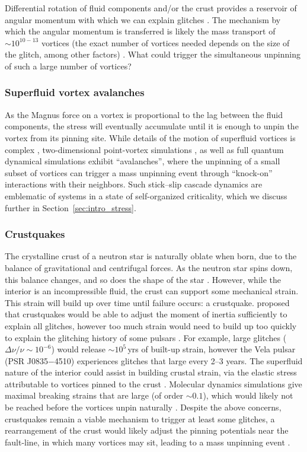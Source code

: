 Differential rotation of fluid components and/or the crust provides a reservoir of angular momentum with which we can explain glitches \citep{Baym1969}. The mechanism by which the angular momentum is transferred is likely the mass transport of $\sim 10^{10-13}$ vortices (the exact number of vortices needed depends on the size of the glitch, among other factors) \citep{Anderson1975,Alpar1984}. What could trigger the simultaneous unpinning of such a large number of vortices? 

\subsubsection{Superfluid vortex avalanches}
As the Magnus force on a vortex is proportional to the lag between the fluid components, the stress will eventually accumulate until it is enough to unpin the vortex from its pinning site. While details of the motion of superfluid vortices is complex \citep{Link2022}, two-dimensional point-vortex simulations \citep{Howitt2020}, as well as full quantum dynamical simulations \citep{Warszawski2011,Warszawski2013,Lonnborn2019} exhibit ``avalanches'', where the unpinning of a small subset of vortices can trigger a mass unpinning event through ``knock-on'' interactions with their neighbors. Such stick--slip cascade dynamics are emblematic of systems in a state of self-organized criticality, which we discuss further in Section~\ref{sec:intro_stress}.

\subsubsection{Crustquakes}
The crystalline crust of a neutron star is naturally oblate when born, due to the balance of gravitational and centrifugal forces. As the neutron star spins down, this balance changes, and so does the shape of the star \citep{Pines1972}. However, while the interior is an incompressible fluid, the crust can support some mechanical strain. This strain will build up over time until failure occurs: a crustquake. \citet{Ruderman1969} proposed that crustquakes would be able to adjust the moment of inertia sufficiently to explain all glitches, however too much strain would need to build up too quickly to explain the glitching history of some pulsars \citep{Baym1971}. For example, large glitches ($\Delta \nu / \nu \sim 10^{-6}$) would release $\sim10^5$\,yrs of built-up strain, however the Vela pulsar (PSR J0835$-$4510) experiences glitches that large every 2--3 years. The superfluid nature of the interior could assist in building crustal strain, via the elastic stress attributable to vortices pinned to the crust \citep{Ruderman1976,Chamel2006}. Molecular dynamics simulations give maximal breaking strains that are large (of order $\sim 0.1$), which would likely not be reached before the vortices unpin naturally \citep{Horowitz2009}. Despite the above concerns, crustquakes remain a viable mechanism to trigger at least some glitches, a rearrangement of the crust would likely adjust the pinning potentials near the fault-line, in which many vortices may sit, leading to a mass unpinning event \citep{Rencoret2021}.

